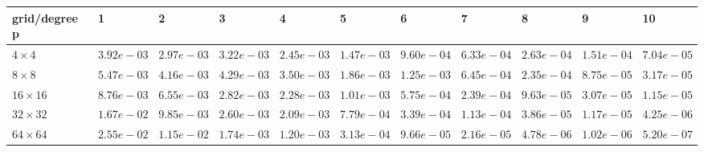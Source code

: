 \begin{tabular}{lllllllllll}
\hline
 grid/degree p   & 1          & 2          & 3          & 4          & 5          & 6          & 7          & 8          & 9          & 10         \\
\hline
 $4 \times 4$    & $3.92e-03$ & $2.97e-03$ & $3.22e-03$ & $2.45e-03$ & $1.47e-03$ & $9.60e-04$ & $6.33e-04$ & $2.63e-04$ & $1.51e-04$ & $7.04e-05$ \\
 $8 \times 8$    & $5.47e-03$ & $4.16e-03$ & $4.29e-03$ & $3.50e-03$ & $1.86e-03$ & $1.25e-03$ & $6.45e-04$ & $2.35e-04$ & $8.75e-05$ & $3.17e-05$ \\
 $16 \times 16$  & $8.76e-03$ & $6.55e-03$ & $2.82e-03$ & $2.28e-03$ & $1.01e-03$ & $5.75e-04$ & $2.39e-04$ & $9.63e-05$ & $3.07e-05$ & $1.15e-05$ \\
 $32 \times 32$  & $1.67e-02$ & $9.85e-03$ & $2.60e-03$ & $2.09e-03$ & $7.79e-04$ & $3.39e-04$ & $1.13e-04$ & $3.86e-05$ & $1.17e-05$ & $4.25e-06$ \\
 $64 \times 64$  & $2.55e-02$ & $1.15e-02$ & $1.74e-03$ & $1.20e-03$ & $3.13e-04$ & $9.66e-05$ & $2.16e-05$ & $4.78e-06$ & $1.02e-06$ & $5.20e-07$ \\
\hline
\end{tabular}